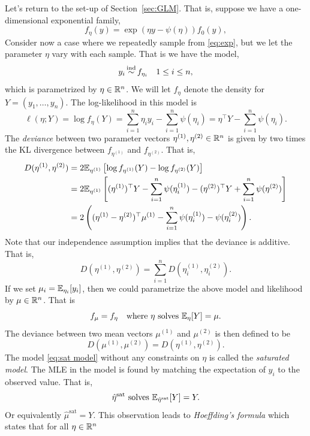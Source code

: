 Let's return to the set-up of Section~\ref{sec:GLM}. That is, suppose we have a one-dimensional exponential family,
\begin{equation}\label{eq:exp}
    f_\eta(y) =  \exp\left(\eta y - \psi(\eta)\right)f_0(y), 
\end{equation}
Consider now a case where we repeatedly sample from \eqref{eq:exp}, but we let the parameter $\eta$ vary with each sample. That is we have the model,
\begin{equation}\label{eq:sat model}y_i \simind f_{\eta_i} \quad 1 \le i \le n, \end{equation}
which is parametrized by $\eta \in \mathbb{R}^n$. We will let $f_\eta$ denote the density for $Y=(y_1,\ldots,y_n)$. The log-likelihood in this model is
\[\ell(\eta;Y) = \log f_\eta(Y) = \sum_{i=1}^n \eta_i y_i - \sum_{i=1}^n \psi(\eta_i) = \eta^\top Y-\sum_{i=1}^n \psi(\eta_i). \]
The \emph{deviance} between two parameter vectors $\eta^{(1)},\eta^{(2)} \in \mathbb{R}^n$ is given by two times the KL divergence between $f_{\eta^{(1)}}$ and $f_{\eta^{(2)}}$. That is,
\begin{align*}
    D(\eta^{(1)},\eta^{(2)})&=2{\mathbb E}_{\eta^{(1)}}\left[\log f_{\eta^{(1)}}(Y) -  \log f_{\eta^{(2)}}(Y)\right] \\
    &= 2{\mathbb E}_{\eta^{(1)}}\left[(\eta^{(1)})^\top Y - \sum_{i=1}^n \psi(\eta_{i}^{(1)}) - (\eta^{(2)})^\top Y +\sum_{i=1}^n \psi(\eta^{(2)})\right]\\
    &= 2\left((\eta^{(1)}-\eta^{(2)})^\top \mu^{(1)} - \sum_{i=1}^n \psi(\eta_i^{(1)}) -\psi(\eta_i^{(2)})\right).
\end{align*}
Note that our independence assumption implies that the deviance is additive. That is,
\[D(\eta^{(1)},\eta^{(2)}) = \sum_{i=1}^n D(\eta^{(1)}_i,\eta^{(2)}_i). \]
If we set $\mu_i = {\mathbb E}_{\eta_i}[y_i]$, then we could parametrize the above model and likelihood by $\mu \in \mathbb{R}^n$. That is
\[f_\mu = f_\eta \quad \text{where } \eta \text{ solves } {\mathbb E}_\eta[Y] = \mu. \]
The deviance between two mean vectors $\mu^{(1)}$ and $\mu^{(2)}$ is then defined to be
\[D(\mu^{(1)}, \mu^{(2)}) = D(\eta^{(1)},\eta^{(2)}). \]
The model \eqref{eq:sat model} without any constraints on $\eta$ is called the \emph{saturated model}. The MLE in the model is found by matching the expectation of $y_i$ to the observed value. That is,
\[\hat{\eta}^{\text{sat}} \text{ solves } {\mathbb E}_{\hat{\eta}^{\text{sat}}}[Y] = Y.\]
Or equivalently $\hat{\mu}^{\text{sat}} = Y$. This observation leads to \emph{Hoeffding's formula} which states that for all $\eta \in \mathbb{R}^n$
